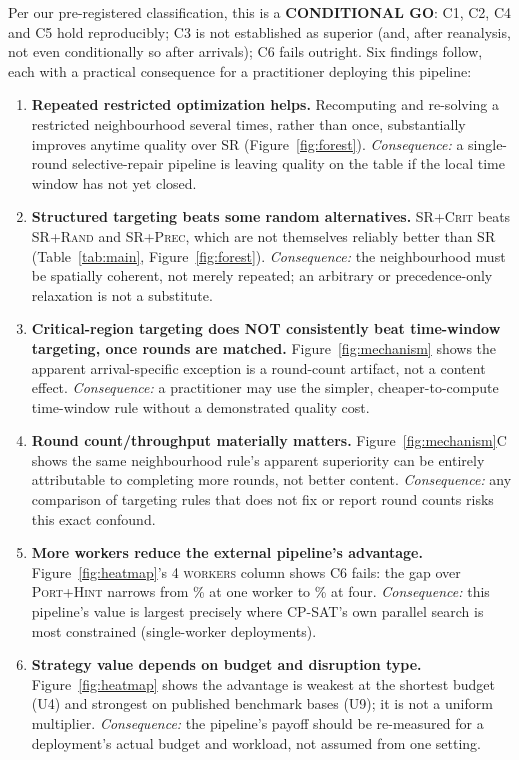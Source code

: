 \documentclass[letterpaper]{article} %
\newcommand{\base}{\textsc{SR}}
\newcommand{\crit}{\textsc{SR+Crit}}
\newcommand{\rnd}{\textsc{SR+Rand}}
\newcommand{\precn}{\textsc{SR+Prec}}
\newcommand{\ph}{\textsc{Port+Hint}}
\begin{document}
Per our pre-registered classification, this is a \textbf{CONDITIONAL GO}: C1, C2, C4 and C5 hold reproducibly; C3 is not established as superior (and, after reanalysis, not even conditionally so after arrivals); C6 fails outright. Six findings follow, each with a practical consequence for a practitioner deploying this pipeline:

\begin{enumerate}
\item \textbf{Repeated restricted optimization helps.} Recomputing and re-solving a restricted neighbourhood several times, rather than once, substantially improves anytime quality over \base{} (Figure~\ref{fig:forest}). \emph{Consequence:} a single-round selective-repair pipeline is leaving quality on the table if the local time window has not yet closed.
\item \textbf{Structured targeting beats some random alternatives.} \crit{} beats \rnd{} and \precn{}, which are not themselves reliably better than \base{} (Table~\ref{tab:main}, Figure~\ref{fig:forest}). \emph{Consequence:} the neighbourhood must be spatially coherent, not merely repeated; an arbitrary or precedence-only relaxation is not a substitute.
\item \textbf{Critical-region targeting does NOT consistently beat time-window targeting, once rounds are matched.} Figure~\ref{fig:mechanism} shows the apparent arrival-specific exception is a round-count artifact, not a content effect. \emph{Consequence:} a practitioner may use the simpler, cheaper-to-compute time-window rule without a demonstrated quality cost.
\item \textbf{Round count/throughput materially matters.} Figure~\ref{fig:mechanism}C shows the same neighbourhood rule's apparent superiority can be entirely attributable to completing more rounds, not better content. \emph{Consequence:} any comparison of targeting rules that does not fix or report round counts risks this exact confound.
\item \textbf{More workers reduce the external pipeline's advantage.} Figure~\ref{fig:heatmap}'s \textsc{4 workers} column shows C6 fails: the gap over \ph{} narrows from \UOneBTwocritVsBSixporthintRel\% at one worker to \UThreeBTwocritVsBSixporthintRel\% at four. \emph{Consequence:} this pipeline's value is largest precisely where CP-SAT's own parallel search is most constrained (single-worker deployments).
\item \textbf{Strategy value depends on budget and disruption type.} Figure~\ref{fig:heatmap} shows the advantage is weakest at the shortest budget (U4) and strongest on published benchmark bases (U9); it is not a uniform multiplier. \emph{Consequence:} the pipeline's payoff should be re-measured for a deployment's actual budget and workload, not assumed from one setting.
\end{enumerate}
\end{document}
